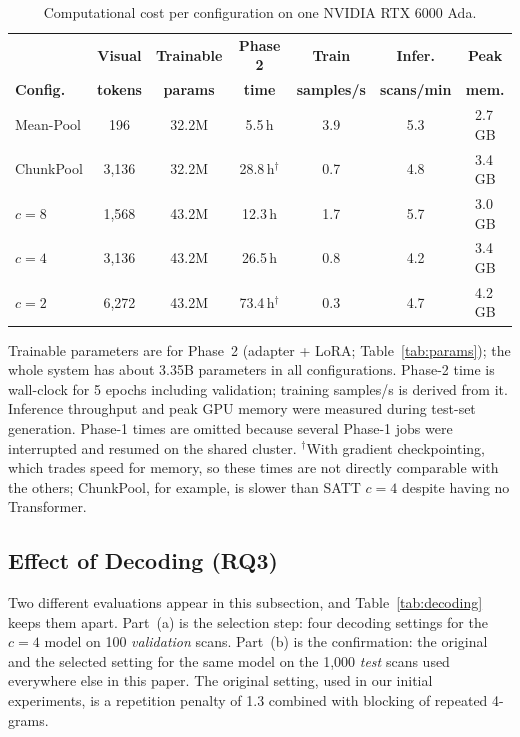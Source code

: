 \documentclass[conference]{IEEEtran}
\begin{document}
\begin{table}[t]
\centering
\caption{Computational cost per configuration on one NVIDIA RTX 6000 Ada.}
\label{tab:cost}
\footnotesize
\setlength{\tabcolsep}{3pt}
\begin{tabular}{@{}lcccccc@{}}
\toprule
& \textbf{Visual} & \textbf{Trainable} & \textbf{Phase 2} & \textbf{Train} & \textbf{Infer.} & \textbf{Peak} \\
\textbf{Config.} & \textbf{tokens} & \textbf{params} & \textbf{time} & \textbf{samples/s} & \textbf{scans/min} & \textbf{mem.} \\
\midrule
Mean-Pool & 196 & 32.2M & 5.5\,h & 3.9 & 5.3 & 2.7\,GB \\
ChunkPool & 3,136 & 32.2M & 28.8\,h$^{\dagger}$ & 0.7 & 4.8 & 3.4\,GB \\
$c=8$ & 1,568 & 43.2M & 12.3\,h & 1.7 & 5.7 & 3.0\,GB \\
$c=4$ & 3,136 & 43.2M & 26.5\,h & 0.8 & 4.2 & 3.4\,GB \\
$c=2$ & 6,272 & 43.2M & 73.4\,h$^{\dagger}$ & 0.3 & 4.7 & 4.2\,GB \\
\bottomrule
\end{tabular}

\vspace{2pt}
\parbox{\columnwidth}{\scriptsize Trainable parameters are for Phase~2
(adapter + LoRA; Table~\ref{tab:params}); the whole system has about 3.35B parameters in all
configurations. Phase-2 time is wall-clock for 5 epochs including validation;
training samples/s is derived from it. Inference throughput and peak GPU
memory were measured during test-set generation. Phase-1 times are omitted
because several Phase-1 jobs were interrupted and resumed on the shared
cluster. $^{\dagger}$With gradient checkpointing, which trades speed for
memory, so these times are not directly comparable with the others; ChunkPool,
for example, is slower than SATT $c=4$ despite having no Transformer.}
\end{table}

\subsection{Effect of Decoding (RQ3)}\label{sec:decoding}

Two different evaluations appear in this subsection, and
Table~\ref{tab:decoding} keeps them apart. Part~(a) is the selection step: four
decoding settings for the $c=4$ model on 100 \emph{validation} scans. Part~(b)
is the confirmation: the original and the selected setting for the same model
on the 1,000 \emph{test} scans used everywhere else in this paper. The
original setting, used in our initial experiments, is a repetition penalty of
1.3 combined with blocking of repeated 4-grams.
\end{document}
